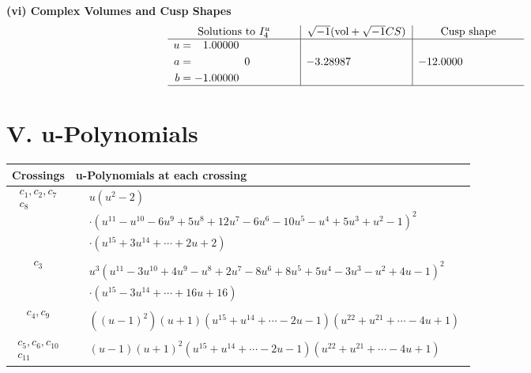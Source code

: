 \documentclass[1p]{elsarticle_modified}
\theoremstyle{definition}
\newcommand{\I}{\sqrt{-1}}
\begin{document}
\newpage\flushleft \textbf{(vi) Complex Volumes and Cusp Shapes}
$$\begin{array}{c|c|c}  
\text{Solutions to }I^u_{4}& \I (\text{vol} + \sqrt{-1}CS) & \text{Cusp shape}\\
 \hline 
\begin{aligned}
u &= \phantom{-}1.00000\phantom{ +0.000000I} \\
a &= \phantom{-0.000000 } 0 \\
b &= -1.00000\phantom{ +0.000000I}\end{aligned}
 & -3.28987\phantom{ +0.000000I} & -12.0000\phantom{ +0.000000I}\\
 \hline 
 \end{array}$$\newpage
\newpage\renewcommand{\arraystretch}{1}
\centering \section*{ V. u-Polynomials}
\begin{tabular}{m{50pt}|m{274pt}}
Crossings & \hspace{64pt}u-Polynomials at each crossing \\
\hline $$\begin{aligned}c_{1},c_{2},c_{7}\\c_{8}\end{aligned}$$&$\begin{aligned}
&u(u^2-2)\\
&\cdot(u^{11}- u^{10}-6 u^9+5 u^8+12 u^7-6 u^6-10 u^5- u^4+5 u^3+u^2-1)^2\\
&\cdot(u^{15}+3 u^{14}+\cdots+2 u+2)
\end{aligned}$\\
\hline $$\begin{aligned}c_{3}\end{aligned}$$&$\begin{aligned}
&u^3(u^{11}-3 u^{10}+4 u^9- u^8+2 u^7-8 u^6+8 u^5+5 u^4-3 u^3- u^2+4 u-1)^2\\
&\cdot(u^{15}-3 u^{14}+\cdots+16 u+16)
\end{aligned}$\\
\hline $$\begin{aligned}c_{4},c_{9}\end{aligned}$$&$\begin{aligned}
&((u-1)^2)(u+1)(u^{15}+u^{14}+\cdots-2 u-1)(u^{22}+u^{21}+\cdots-4 u+1)
\end{aligned}$\\
\hline $$\begin{aligned}c_{5},c_{6},c_{10}\\c_{11}\end{aligned}$$&$\begin{aligned}
&(u-1)(u+1)^2(u^{15}+u^{14}+\cdots-2 u-1)(u^{22}+u^{21}+\cdots-4 u+1)
\end{aligned}$\\
\hline
\end{tabular}\newpage\renewcommand{\arraystretch}{1}
\end{document}

